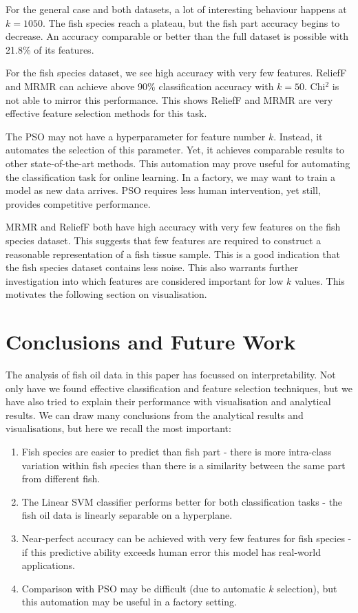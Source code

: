 \documentclass[runningheads]{llncs}
\begin{document}
For the general case and both datasets, a lot of interesting behaviour happens at $k=1050$.
The fish species reach a plateau, but the fish part accuracy begins to decrease.
An accuracy comparable or better than the full dataset is possible with 21.8\% of its features.

For the fish species dataset, we see high accuracy with very few features.
ReliefF and MRMR can achieve above 90\% classification accuracy with $k = 50$.
Chi$^2$ is not able to mirror this performance.
This shows ReliefF and MRMR are very effective feature selection methods for this task.

The PSO may not have a hyperparameter for feature number $k$.
Instead, it automates the selection of this parameter.
Yet, it achieves comparable results to other state-of-the-art methods.
This automation may prove useful for automating the classification task for online learning.
In a factory, we may want to train a model as new data arrives.
PSO requires less human intervention, yet still, provides competitive performance.

MRMR and ReliefF both have high accuracy with very few features on the fish species dataset.
This suggests that few features are required to construct a reasonable representation of a fish tissue sample.
This is a good indication that the fish species dataset contains less noise.
This also warrants further investigation into which features are considered important for low $k$ values.
This motivates the following section on visualisation.

\section{Conclusions and Future Work}


The analysis of fish oil data in this paper has focussed on interpretability. 
Not only have we found effective classification and feature selection techniques, but we have also tried to explain their performance with visualisation and analytical results. 
We can draw many conclusions from the analytical results and visualisations, but here we recall the most important:

\begin{enumerate}
  \item Fish species are easier to predict than fish part - there is more intra-class variation within fish species than there is a similarity between the same part from different fish.
  \item The Linear SVM classifier performs better for both classification tasks - the fish oil data is linearly separable on a hyperplane.
  \item Near-perfect accuracy can be achieved with very few features for fish species - if this predictive ability exceeds human error this model has real-world applications.
  \item Comparison with PSO may be difficult (due to automatic $k$ selection), but this automation may be useful in a factory setting.
\end{enumerate}
\end{document}

